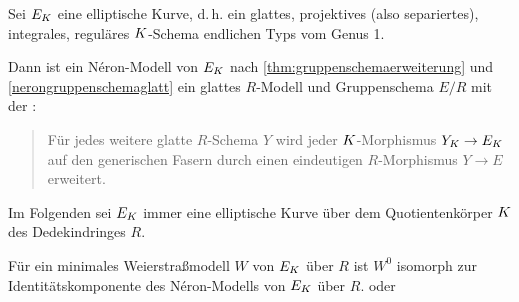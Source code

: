 \documentclass[german]{scrreprt}
\begin{document}
\begin{Bemerkung}
  Sei $E_{K}$ eine elliptische Kurve, d.\,h. ein
  glattes, projektives (also separiertes), integrales, reguläres
  $K$-Schema endlichen Typs vom Genus 1.
  
  Dann ist ein Néron-Modell von $E_{K}$ nach
  \ref{thm:gruppenschemaerweiterung} und \ref{nerongruppenschemaglatt} ein
  glattes $R$-Modell und Gruppenschema $E/R$ mit der
  \NAbbEig:
  \begin{quote}
    Für jedes weitere glatte $R$-Schema $Y$ wird jeder
    $K$-Morphismus $Y_{K}\to E_{K}$ auf den generischen Fasern durch
    einen eindeutigen $R$-Morphismus $Y\to E$ erweitert.
  \end{quote}
  \cite[Chapter IV.5]{silverman2}
\end{Bemerkung}

Im Folgenden sei $E_{K}$ immer eine elliptische Kurve über dem
Quotientenkörper $K$ des Dedekindringes $R$.

\begin{Bemerkung}
  Für ein minimales Weierstraßmodell $W$ von $E_{K}$ über $R$
  ist $W^0$ isomorph zur Identitätskomponente des Néron-Modells von
  $E_{K}$ über $R$.
  \cite[Corollary IV.9.1]{silverman2} oder
  \cite[Chapter 1.5, S.\,23]{neron}
\end{Bemerkung}
\end{document}
